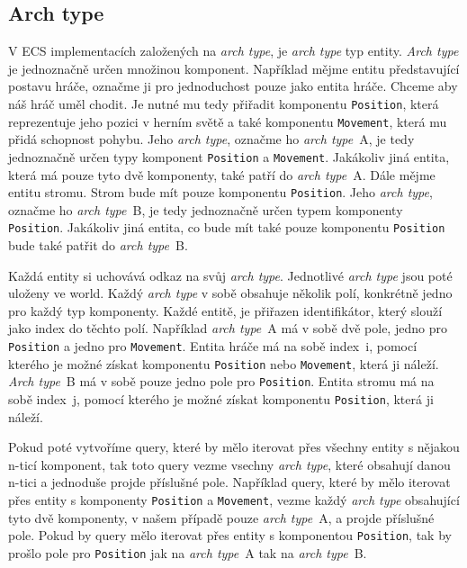 \subsection{Arch type}
V ECS implementacích založených na \textit{arch type}, je \textit{arch type} typ entity. \textit{Arch type} je jednoznačně určen množinou komponent. Například mějme entitu představující postavu hráče, označme ji pro jednoduchost pouze jako entita hráče. Chceme aby náš hráč uměl chodit. Je nutné mu tedy přiřadit komponentu \verb|Position|, která reprezentuje jeho pozici v herním světě a také komponentu \verb|Movement|, která mu přidá schopnost pohybu. Jeho \textit{arch type}, označme ho \textit{arch type}~A, je tedy jednoznačně určen typy komponent \verb|Position| a \verb|Movement|. Jakákoliv jiná entita, která má pouze tyto dvě komponenty, také patří do \textit{arch type}~A. Dále mějme entitu stromu. Strom bude mít pouze komponentu \verb|Position|. Jeho \textit{arch type}, označme ho \textit{arch type}~B, je tedy jednoznačně určen typem komponenty \verb|Position|. Jakákoliv jiná entita, co bude mít také pouze komponentu \verb|Position| bude také patřit do \textit{arch type}~B.

Každá entity si uchovává odkaz na svůj \textit{arch type}. Jednotlivé \textit{arch type} jsou poté uloženy ve world. Každý \textit{arch type} v sobě obsahuje několik polí, konkrétně jedno pro každý typ komponenty. Každé entitě, je přiřazen identifikátor, který slouží jako index do těchto polí. Například \textit{arch type}~A má v sobě dvě pole, jedno pro \verb|Position| a jedno pro \verb|Movement|. Entita hráče má na sobě index~i, pomocí kterého je možné získat komponentu \verb|Position| nebo \verb|Movement|, která ji náleží. \textit{Arch type}~B má v sobě pouze jedno pole pro \verb|Position|. Entita stromu má na sobě index~j, pomocí kterého je možné získat komponentu \verb|Position|, která ji náleží.

Pokud poté vytvoříme query, které by mělo iterovat přes všechny entity s nějakou n-ticí komponent, tak toto query vezme vsechny \textit{arch type}, které obsahují danou n-tici a jednoduše projde příslušné pole. Například query, které by mělo iterovat přes entity s komponenty \verb|Position| a \verb|Movement|, vezme každý \textit{arch type} obsahující tyto dvě komponenty, v našem případě pouze \textit{arch type}~A, a projde příslušné pole. Pokud by query mělo iterovat přes entity s komponentou \verb|Position|, tak by prošlo pole pro \verb|Position| jak na \textit{arch type}~A tak na \textit{arch type}~B.

